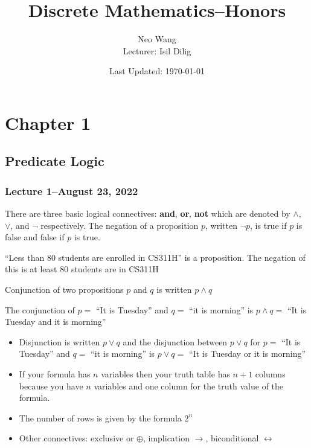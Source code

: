 \documentclass{scrreprt}
\title{Discrete Mathematics--Honors}
\author{Neo Wang\\ Lecturer: Isil Dilig}
\date{Last Updated: \today}
\begin{document}
\maketitle

\chapter{Chapter 1}

\section{Predicate Logic}
\subsection{Lecture 1--August 23, 2022}

There are three basic logical connectives: \textbf{and}, \textbf{or}, \textbf{not}
which are denoted by $\land$, $\lor$, and $\neg$ respectively.
The negation of a proposition $p$, written $\neg p$, is true if $p$ is false and false if $p$ is true.

\begin{example}
	``Less than 80 students are enrolled in CS311H'' is a proposition. The negation of this is at least $80$ students are in CS311H
\end{example}

Conjunction of two propositions $p$ and $q$ is written $p\land q$

\begin{example}
	The conjunction of $p=$ ``It is Tuesday'' and $q=$ ``it is morning'' is $p\land q=$ ``It is Tuesday and it is morning''
\end{example}

\begin{itemize}
	\item Disjunction is written $p\lor q$ and the disjunction between $p\lor q$ for $p=$ ``It is Tuesday'' and $q=$ ``it is morning'' is $p\lor q=$ ``It is Tuesday or it is morning''
	\item If your formula has $n$ variables then your truth table has $n+1$ columns because you have $n$ variables and one column for the truth value of the formula.
	\item The number of rows is given by the formula $2^n$
	\item Other connectives: exclusive or $\oplus$, implication $\rightarrow$, biconditional $\leftrightarrow$
\end{itemize}
\end{document}
